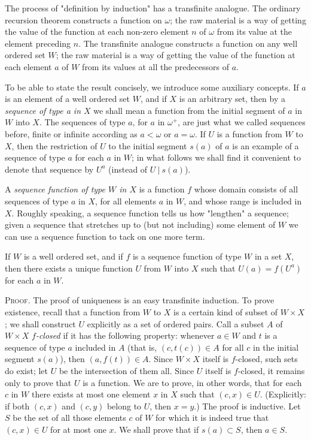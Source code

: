 
The process of "definition by induction" has a   transfinite analogue. The ordinary recursion theorem constructs a function on $\omega$; the raw material is a way of getting the value of the function at each non-zero element $n$ of $\omega$ from its value at the element preceding $n$. The transfinite analogue constructs a function on any well ordered set $W$; the raw material is a way of getting the value of the function at each element $a$ of $W$ from its values at all the predecessors of $a$. 

To be able to state the result concisely, we introduce some auxiliary concepts. If $a$ is an element of a well ordered set $W$, and if $X$ is an arbitrary set, then by a \textit{sequence of type a in $X$} we shall mean a function from the initial segment of $a$ in $W$ into $X$. The sequences of type $a$, for $a$ in $\omega^{+}$, are just what we called sequences before, finite or infinite according as $a < \omega$ or $a =  \omega$. If $U$ is a function from $W$ to $X$, then the restriction of $U$ to the initial segment $s(a)$ of $a$ is an example of a sequence of type $a$ for each $a$ in $W$; in what follows we shall find it convenient to denote that sequence by $U^{a}$ (instead of $U\ |\ s(a)$).

A \textit{sequence function of type $W$ in $X$} is a function $f$ whose domain consists of all sequences of type $a$ in $X$, for all elements $a$ in $W$, and whose range is included in $X$. Roughly speaking, a sequence function tells us how "lengthen" a sequence; given a sequence that stretches up to (but not including) some element of $W$ we can use a sequence function to tack on one more term. 

\begin{named} If $W$ is a well ordered set, and if $f$ is a sequence function of type $W$ in a set $X$, then there exists a unique function $U$ from $W$ into $X$ such that $U(a) = f(U^{a})$ for each $a$ in $W$.
\end{named}

\textsc{Proof}. The proof of uniqueness is an easy transfinite induction. To prove existence, recall that a function from $W$ to $X$ is a certain kind of subset of $W \times X$; we shall construct $U$ explicitly as a set of ordered pairs. Call a subset $A$ of $W \times X$ $f$\textit{-closed} if it has the following property: whenever $a \in W$ and $t$ is a sequence of type $a$ included in $A$ (that is, $(c, t(c)) \in A$ for all $c$ in the initial segment $s(a)$), then $(a,f(t)) \in A$. Since $W \times X$ itself is $f$-closed, such sets do exist; let $U$ be the intersection of them all. Since $U$ itself is $f$-closed, it remains only to prove that $U$ is a function. We are to prove, in other words, that for each $c$ in $W$ there exists at most one element $x$ in $X$ such that $(c,x) \in U$. (Explicitly: if both $(c, x)$ and $(c,y)$ belong to $U$, then $x = y$.) The proof is inductive. Let $S$ be the set of all those elements $c$ of $W$ for which it is indeed true that $(c, x) \in U$ for at most one $x$. We shall prove that if $s(a) \subset S$, then $a \in S$. 

